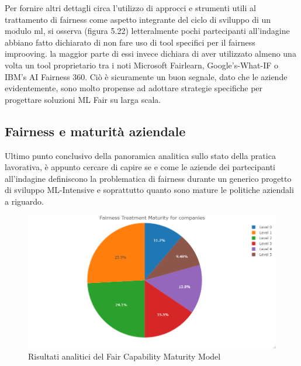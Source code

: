     Per fornire altri dettagli circa l'utilizzo di approcci e strumenti utili al trattamento di fairness come aspetto integrante del ciclo di sviluppo di un modulo ml, si osserva (figura 5.22) letteralmente pochi partecipanti all'indagine abbiano fatto dichiarato di non fare uso di tool specifici per il fairness improoving. la maggior parte di essi invece dichiara di aver utilizzato almeno una volta un tool proprietario tra i noti Microsoft Fairlearn, Google's-What-IF o IBM's AI Fairness 360. Ciò è sicuramente un buon segnale, dato che le aziende evidentemente, sono molto propense ad adottare strategie specifiche per progettare soluzioni ML Fair su larga scala.
    \subsection{Fairness e maturità aziendale}
    
    \begin{center}
    	\hspace*{-5mm}%
    \end{center}
    
    Ultimo punto conclusivo della panoramica analitica sullo stato della pratica lavorativa, è appunto cercare di capire se e come le aziende dei partecipanti all'indagine definiscono la problematica di fairness durante un generico progetto di sviluppo ML-Intensive e soprattutto quanto sono mature le politiche aziendali a riguardo. 
    
    \begin{figure}[h!]
        \centering
        \includegraphics[width=1\textwidth]{figure/Analisi/RQ5/Fairness Treatment Maturity for companies.png}
        \caption{Risultati analitici del Fair Capability Maturity Model}
    \end{figure}
    
